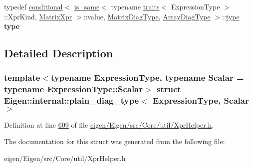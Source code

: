 \begin{DoxyCompactItemize}
typedef \hyperlink{struct_eigen_1_1internal_1_1conditional}{conditional}$<$ \hyperlink{struct_eigen_1_1internal_1_1is__same}{is\+\_\+same}$<$ typename \hyperlink{struct_eigen_1_1internal_1_1traits}{traits}$<$ Expression\+Type $>$\+::Xpr\+Kind, \hyperlink{struct_eigen_1_1_matrix_xpr}{Matrix\+Xpr} $>$\+::value, \hyperlink{group___core___module_class_eigen_1_1_matrix}{Matrix\+Diag\+Type}, \hyperlink{group___core___module_class_eigen_1_1_array}{Array\+Diag\+Type} $>$\+::\hyperlink{class_eigen_1_1internal_1_1_tensor_lazy_evaluator_writable}{type} {\bfseries type}
\end{DoxyCompactItemize}


\subsection{Detailed Description}
\subsubsection*{template$<$typename Expression\+Type, typename Scalar = typename Expression\+Type\+::\+Scalar$>$\newline
struct Eigen\+::internal\+::plain\+\_\+diag\+\_\+type$<$ Expression\+Type, Scalar $>$}



Definition at line \hyperlink{eigen_2_eigen_2src_2_core_2util_2_xpr_helper_8h_source_l00609}{609} of file \hyperlink{eigen_2_eigen_2src_2_core_2util_2_xpr_helper_8h_source}{eigen/\+Eigen/src/\+Core/util/\+Xpr\+Helper.\+h}.



The documentation for this struct was generated from the following file\+:\begin{DoxyCompactItemize}
\item 
eigen/\+Eigen/src/\+Core/util/\+Xpr\+Helper.\+h\end{DoxyCompactItemize}
